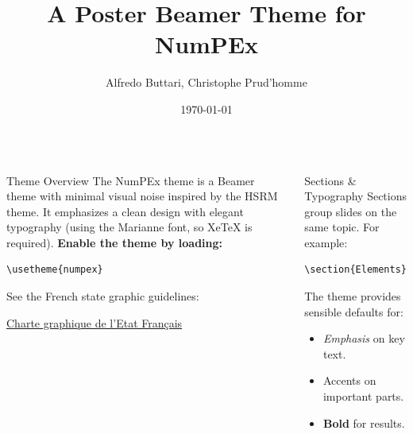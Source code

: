 \documentclass[final]{beamer}
\title{A Poster Beamer Theme for NumPEx}
\author{Alfredo Buttari, Christophe Prud'homme}
\institute{Institute or Miscellaneous Information}
\date{\today}
\begin{document}
\begin{frame}[t,fragile]{}
  \vspace*{5cm}
  \begin{center}
    \begin{minipage}{0.9\paperwidth}
      \begin{columns}[t,totalwidth=\textwidth]
        
          \begin{block}{Theme Overview}
            The NumPEx theme is a Beamer theme with minimal visual noise inspired by the HSRM theme. It emphasizes a clean design with elegant typography (using the Marianne font, so XeTeX is required).  
            \vspace{0.3cm}
            \textbf{Enable the theme by loading:}
            \begin{verbatim}
\usetheme{numpex}
            \end{verbatim}
            \vspace{0.3cm}
            See the French state graphic guidelines:
            \begin{center}
              \alert{\href{https://www.info.gouv.fr/marque-de-letat}{Charte graphique de l'Etat Français}}
            \end{center}
          \end{block}
          
          \vspace{0.5cm}
          
          \begin{block}{Sections \& Typography}
            Sections group slides on the same topic. For example:
            \begin{verbatim}
\section{Elements}
            \end{verbatim}
            The theme provides sensible defaults for:
            \begin{itemize}
              \item \emph{Emphasis} on key text.
              \item \alert{Accents} on important parts.
              \item \textbf{Bold} for results.
            \end{itemize}
          \end{block}
        

\end{columns}
\end{minipage}
\end{center}
\end{frame}
\end{document}
